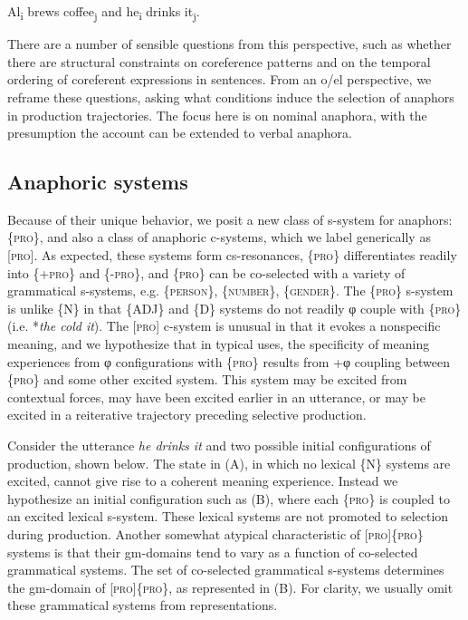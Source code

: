 \ea
    {Al\textsubscript{i} brews coffee\textsubscript{j} and he\textsubscript{i} drinks it\textsubscript{j}}.
\z

  There are a number of sensible questions from this perspective, such as whether there are structural constraints on coreference patterns and on the temporal ordering of coreferent expressions in sentences. From an o/el perspective, we reframe these questions, asking what conditions induce the selection of anaphors in production trajectories. The focus here is on nominal anaphora, with the presumption the account can be extended to verbal anaphora. 

\subsection{Anaphoric systems}

Because of their unique behavior, we posit a new class of s-system for anaphors: \{\textsc{pro}\}, and also a class of anaphoric c-systems, which we label generically as [\textsc{pro}]. As expected, these systems form cs-resonances,  \{\textsc{pro}\} differentiates readily into \{+\textsc{pro}\} and \{-\textsc{pro}\}, and \{\textsc{pro}\} can be co-selected with a variety of grammatical s-systems, e.g. \{\textsc{person}\}, \{\textsc{number}\}, \{\textsc{gender}\}. The \{\textsc{pro}\} s-system is unlike \{N\} in that \{ADJ\} and \{D\} systems do not readily φ couple with \{\textsc{pro}\} (i.e. *\textit{the cold it}). The [\textsc{pro}] c-system is unusual in that it evokes a nonspecific meaning, and we hypothesize that in typical uses, the specificity of meaning experiences from φ configurations with \{\textsc{pro}\} results from +φ coupling between \{\textsc{pro}\} and some other excited system. This system may be excited from contextual forces, may have been excited earlier in an utterance, or may be excited in a reiterative trajectory preceding selective production. 

   Consider the utterance \textit{he drinks it} and two possible initial configurations of production, shown below. The state in (A), in which no lexical \{N\} systems are excited, cannot give rise to a coherent meaning experience. Instead we hypothesize an initial configuration such as (B), where each \{\textsc{pro}\} is coupled to an excited lexical s-system. These lexical systems are not promoted to selection during production. Another somewhat atypical characteristic of [\textsc{pro}]\{\textsc{pro}\} systems is that their gm-domains tend to vary as a function of co-selected grammatical systems. The set of co-selected grammatical s-systems determines the gm-domain of [\textsc{pro}]\{\textsc{pro}\}, as represented in (B). For clarity, we usually omit these grammatical systems from representations.   

